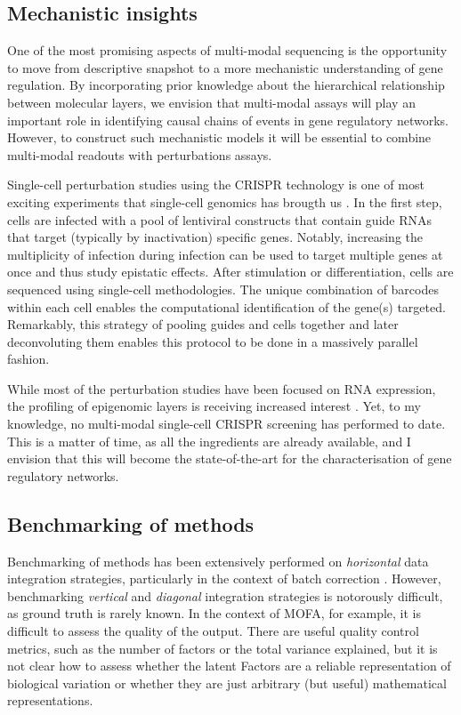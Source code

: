 \subsection{Mechanistic insights}

One of the most promising aspects of multi-modal sequencing is the opportunity to move from descriptive snapshot to a more mechanistic understanding of gene regulation. By incorporating prior knowledge about the hierarchical relationship between molecular layers, we envision that multi-modal assays will play an important role in identifying causal chains of events in gene regulatory networks. However, to construct such mechanistic models it will be essential to combine multi-modal readouts with perturbations assays.

Single-cell perturbation studies using the CRISPR technology is one of most exciting experiments that single-cell genomics has brougth us \cite{Dixit2016,Datlinger2017,Jaitin2016,Alda-Catalinas2020}. In the first step, cells are infected with a pool of lentiviral constructs that contain guide RNAs that target (typically by inactivation) specific genes. Notably, increasing the multiplicity of infection during infection can be used to target multiple genes at once and thus study epistatic effects. After stimulation or differentiation, cells are sequenced using single-cell  methodologies. The unique combination of barcodes within each cell enables the computational identification of the gene(s) targeted. Remarkably, this strategy of pooling guides and cells together and later deconvoluting them enables this protocol to be done in a massively parallel fashion.

While most of the perturbation studies have been focused on RNA expression, the profiling of epigenomic layers is receiving increased interest \cite{Rubin2019}. Yet, to my knowledge, no multi-modal single-cell CRISPR screening has performed to date. This is a matter of time, as all the ingredients are already available, and I envision that this will become the state-of-the-art for the characterisation of gene regulatory networks.


\subsection{Benchmarking of methods} 

Benchmarking of methods has been extensively performed on \textit{horizontal} data integration strategies, particularly in the context of batch correction \cite{Luecken2020,Tran2020}. However, benchmarking \textit{vertical} and \textit{diagonal} integration strategies is notorously difficult, as ground truth is rarely known. In the context of MOFA, for example, it is difficult to assess the quality of the output. There are useful quality control metrics, such as the number of factors or the total variance explained, but it is not clear how to assess whether the latent Factors are a reliable representation of biological variation or whether they are just arbitrary (but useful) mathematical representations.

